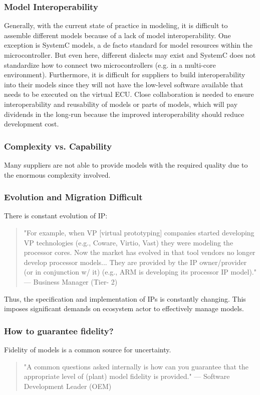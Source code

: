 \subsubsection{Model Interoperability}
Generally, with the current state of practice in modeling, it is difficult to assemble different models because of a lack of model interoperability. One exception is SystemC models, a de facto standard for model resources within the microcontroller. But even here, different dialects may exist and SystemC does not standardize how to connect two microcontrollers (e.g. in a multi-core environment). Furthermore, it is difficult for suppliers to build interoperability into their models since they will not have the low-level software available that needs to be executed on the virtual ECU. Close collaboration is needed to ensure interoperability and reusability of models or parts of models, which will pay dividends in the long-run because the improved interoperability should reduce development cost.

\subsubsection{Complexity vs. Capability}
Many suppliers are not able to provide models with the required quality due to the enormous complexity involved.

\subsubsection{Evolution and Migration Difficult}
There is constant evolution of IP:

\begin{quote}
"For example, when VP [virtual prototyping] companies started developing VP technologies (e.g., Coware, Virtio, Vast) they were modeling the processor cores. Now the market has evolved in that tool vendors no longer develop processor models... They are provided by the IP owner/provider (or in conjunction w/ it) (e.g., ARM is developing its processor IP model)." 
— Business Manager (Tier- 2)
\end{quote}

Thus, the specification and implementation of IPs is constantly changing. This imposes significant demands on ecosystem actor to effectively manage models.

\subsubsection{How to guarantee fidelity?}
Fidelity of models is a common source for uncertainty.
\begin{quote}
"A common questions asked internally is how can you guarantee that the appropriate level of (plant) model fidelity is provided." 
— Software Development Leader (OEM)
\end{quote}

